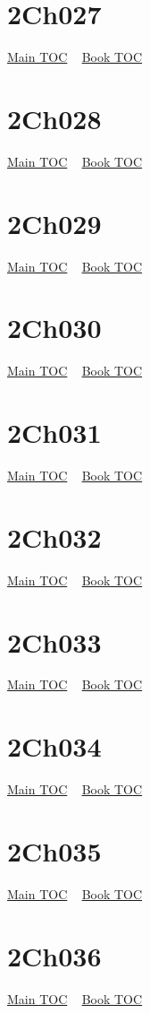 \documentclass{book}
\begin{document}
  \section{2Ch027}\hyperlink{toc}{Main TOC} ~ \hyperref[subsec:2Ch]{Book TOC} 
  \section{2Ch028}\hyperlink{toc}{Main TOC} ~ \hyperref[subsec:2Ch]{Book TOC} 
  \section{2Ch029}\hyperlink{toc}{Main TOC} ~ \hyperref[subsec:2Ch]{Book TOC} 
  \section{2Ch030}\hyperlink{toc}{Main TOC} ~ \hyperref[subsec:2Ch]{Book TOC} 
  \section{2Ch031}\hyperlink{toc}{Main TOC} ~ \hyperref[subsec:2Ch]{Book TOC} 
  \section{2Ch032}\hyperlink{toc}{Main TOC} ~ \hyperref[subsec:2Ch]{Book TOC} 
  \section{2Ch033}\hyperlink{toc}{Main TOC} ~ \hyperref[subsec:2Ch]{Book TOC} 
  \section{2Ch034}\hyperlink{toc}{Main TOC} ~ \hyperref[subsec:2Ch]{Book TOC} 
  \section{2Ch035}\hyperlink{toc}{Main TOC} ~ \hyperref[subsec:2Ch]{Book TOC} 
  \section{2Ch036}\hyperlink{toc}{Main TOC} ~ \hyperref[subsec:2Ch]{Book TOC} 
\end{document}

